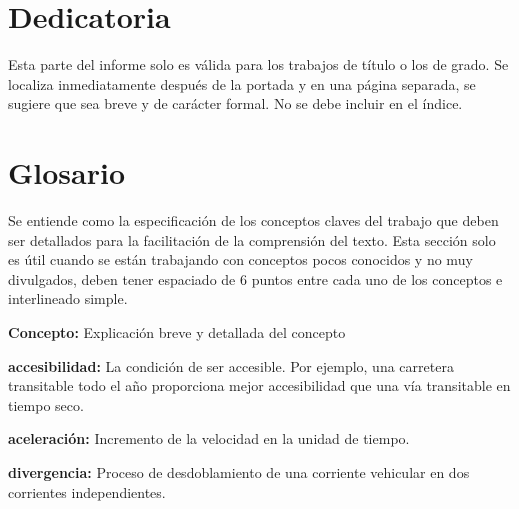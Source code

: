 \documentclass[12pt,letterpaper]{report}
\begin{document}
\chapter*{Dedicatoria}

Esta parte del informe solo es válida para los trabajos de título o los de grado. Se localiza inmediatamente después de la portada y en una página separada, se sugiere que sea breve y de carácter formal. No se debe incluir en el índice.

\newpage
\tableofcontents

\newpage
\listoffigures

\newpage
\listoftables

\newpage
\chapter*{Glosario}

Se entiende como la especificación de los conceptos claves del trabajo que deben ser detallados para la facilitación de la comprensión del texto. Esta sección solo es útil cuando se están trabajando con conceptos pocos conocidos y no muy divulgados, deben tener espaciado de 6 puntos entre cada uno de los conceptos e interlineado simple.

\vspace{6pt}
\noindent\textbf{Concepto:} Explicación breve y detallada del concepto

\vspace{6pt}
\noindent\textbf{accesibilidad:} La condición de ser accesible. Por ejemplo, una carretera transitable todo el año proporciona mejor accesibilidad que una vía transitable en tiempo seco.

\vspace{6pt}
\noindent\textbf{aceleración:} Incremento de la velocidad en la unidad de tiempo.

\vspace{6pt}
\noindent\textbf{divergencia:} Proceso de desdoblamiento de una corriente vehicular en dos corrientes independientes.
\end{document}
